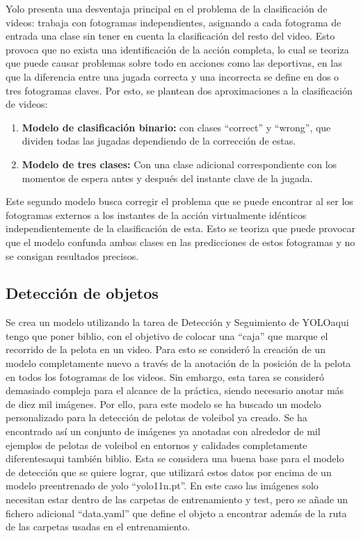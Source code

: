 \documentclass[12pt]{report} %
\begin{document}
    Yolo presenta una desventaja principal en el problema de la clasificación de videos: trabaja con fotogramas independientes, asignando a cada fotograma de entrada una clase sin tener en cuenta la clasificación del resto del video. Esto provoca que no exista una identificación de la acción completa, lo cual se teoriza que puede causar problemas sobre todo en acciones como las deportivas, en las que la diferencia entre una jugada correcta y una incorrecta se define en dos o tres fotogramas claves. Por esto, se plantean dos aproximaciones a la clasificación de videos:
    \begin{enumerate}
        \item \textbf{Modelo de clasificación binario:} con clases “correct” y “wrong”, que dividen todas las jugadas dependiendo de la corrección de estas.
        \item \textbf{Modelo de tres clases:} Con una clase adicional correspondiente con los momentos de espera antes y después del instante clave de la jugada.
    \end{enumerate}
    Este segundo modelo busca corregir el problema que se puede encontrar al ser los fotogramas externos a los instantes de la acción virtualmente idénticos independientemente de la clasificación de esta. Esto se teoriza que puede provocar que el modelo confunda ambas clases en las predicciones de estos fotogramas y no se consigan resultados precisos.
    
    \subsection{Detección de objetos}
    Se crea un modelo utilizando la tarea de Detección y Seguimiento de YOLO{aqui tengo que poner biblio}, con el objetivo de colocar una “caja” que marque el recorrido de la pelota en un video. Para esto se consideró la creación de un modelo completamente nuevo a través de la anotación de la posición de la pelota en todos los fotogramas de los videos. Sin embargo, esta tarea se consideró demasiado compleja para el alcance de la práctica, siendo necesario anotar más de diez mil imágenes. 
    Por ello, para este modelo se ha buscado un modelo personalizado para la detección de pelotas de voleibol ya creado. Se ha encontrado así un conjunto de imágenes ya anotadas con alrededor de mil ejemplos de pelotas de voleibol en entornos y calidades completamente diferentes{aqui también biblio}. Esta se considera una buena base para el modelo de detección que se quiere lograr, que utilizará estos datos por encima de un modelo preentrenado de yolo “yolo11n.pt”. En este caso las imágenes solo necesitan estar dentro de las carpetas de entrenamiento y test, pero se añade un fichero adicional “data.yaml” que define el objeto a encontrar además de la ruta de las carpetas usadas en el entrenamiento. 
    
\end{document}
